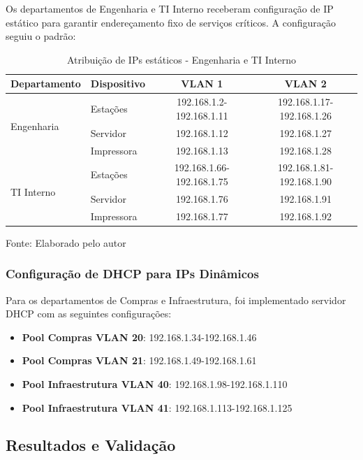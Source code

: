 Os departamentos de Engenharia e TI Interno receberam configuração de IP estático para garantir endereçamento fixo de serviços críticos. A configuração seguiu o padrão:

\begin{table}[H]
\centering
\caption{Atribuição de IPs estáticos - Engenharia e TI Interno}
\begin{tabular}{|l|l|c|c|}
\hline
\textbf{Departamento} & \textbf{Dispositivo} & \textbf{VLAN 1} & \textbf{VLAN 2} \\
\hline
\multirow{3}{*}{Engenharia} & Estações & 192.168.1.2-192.168.1.11 & 192.168.1.17-192.168.1.26 \\
\cline{2-4}
& Servidor & 192.168.1.12 & 192.168.1.27 \\
\cline{2-4}
& Impressora & 192.168.1.13 & 192.168.1.28 \\
\hline
\multirow{3}{*}{TI Interno} & Estações & 192.168.1.66-192.168.1.75 & 192.168.1.81-192.168.1.90 \\
\cline{2-4}
& Servidor & 192.168.1.76 & 192.168.1.91 \\
\cline{2-4}
& Impressora & 192.168.1.77 & 192.168.1.92 \\
\hline
\end{tabular}
\label{tab:ips_estaticos}
{\fontsize{10pt}{\baselineskip}\selectfont
Fonte: Elaborado pelo autor}
\end{table}

\subsubsection{Configuração de DHCP para IPs Dinâmicos}

Para os departamentos de Compras e Infraestrutura, foi implementado servidor DHCP com as seguintes configurações:

\begin{itemize}
    \item \textbf{Pool Compras VLAN 20}: 192.168.1.34-192.168.1.46
    \item \textbf{Pool Compras VLAN 21}: 192.168.1.49-192.168.1.61
    \item \textbf{Pool Infraestrutura VLAN 40}: 192.168.1.98-192.168.1.110
    \item \textbf{Pool Infraestrutura VLAN 41}: 192.168.1.113-192.168.1.125
\end{itemize}

\subsection{Resultados e Validação}

